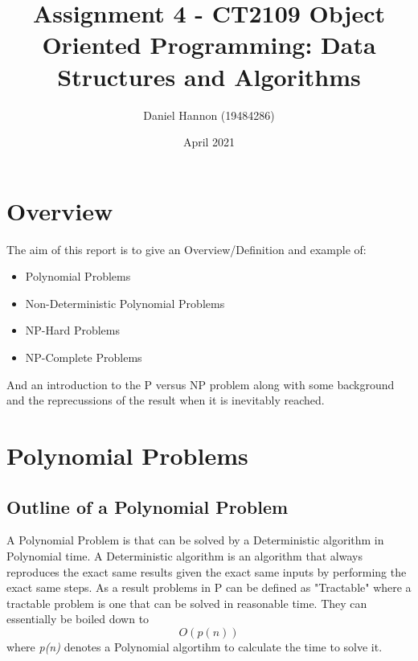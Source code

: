 \documentclass{article}
\title{Assignment 4 - CT2109 Object Oriented Programming: Data Structures and Algorithms}
\author{Daniel Hannon (19484286)}
\date{April 2021}
\begin{document}
	\maketitle
	\section{Overview}
	The aim of this report is to give an Overview/Definition and example of:
	\begin{itemize}
		\item Polynomial Problems
		\item Non-Deterministic Polynomial Problems
		\item NP-Hard Problems
		\item NP-Complete Problems
	\end{itemize}
	And an introduction to the P versus NP problem along with some background and the reprecussions of the result when it is inevitably reached.
	\section{Polynomial Problems}
	\subsection{Outline of a Polynomial Problem}
	A Polynomial Problem is that can be solved by a Deterministic algorithm in Polynomial time. A Deterministic algorithm is an algorithm that always reproduces the exact same results given the exact same inputs by performing the exact same steps. As a result problems in P can be defined as "Tractable" where a tractable problem is one that can be solved in reasonable time. They can essentially be boiled down to $$O(p(n))$$ where \textit{p(n)} denotes a Polynomial algortihm to calculate the time to solve it.
\end{document}

